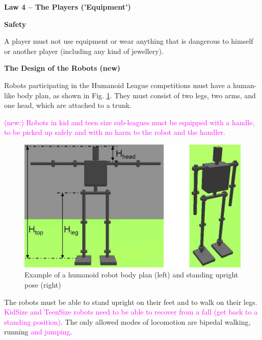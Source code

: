 \clearpage
\sffamily
{\bfseries\color[rgb]{0.4,0.4,0.4}
Law 4 -- The Players ('Equipment')}

\bigskip

{\bfseries Safety }

\headlinebox

A player must not use equipment or wear anything that is dangerous to himself or another player (including any kind of jewellery).

\bigskip

{\bfseries The Design of the Robots (new)}

\headlinebox

Robots participating in the Humanoid League competitions must have a human-like body plan, as shown in Fig. \ref{fig:bodyplan}. They must consist of two legs, two arms, and one head, which are attached to a trunk.

\bigskip

\textcolor{magenta}{(new:) Robots in kid and teen size sub-leagues must be equipped with a handle, to be picked up safely and with no harm to the robot and the handler.}

\begin{center}
\begin{figure}[h]
\includegraphics[width=\textwidth]{img/bodyplan.png}
\caption{Example of a humanoid robot body plan (left) and standing upright pose (right)}
\label{fig:bodyplan}
\end{figure}
\end{center}

The robots must be able to stand upright on their feet and to walk on their legs. \textcolor{magenta}{KidSize and TeenSize robots need to be able to recover from a fall (get back to a standing position)}. The only allowed modes of locomotion are bipedal walking, running \textcolor{magenta}{and jumping}.

